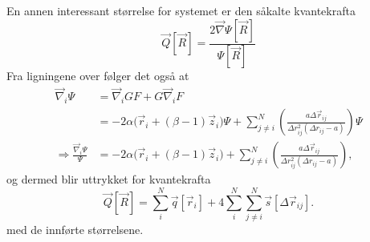 \documentclass[pdftex,10pt,b5paper,twoside]{book}
\begin{document}
En annen interessant størrelse for systemet er den såkalte kvantekrafta
\begin{equation}
\vec{Q}[\vec{R}] = \frac{2\vec{\nabla}\Psi[\vec{R}]}{\Psi[\vec{R}]}
\end{equation}
Fra ligningene over følger det også at
\begin{align}
\vec{\nabla}_i\Psi &= \vec{\nabla}_i G F + G \vec{\nabla}_i F \nonumber\\
&= -2\alpha\Big(\vec{r}_i+(\beta-1)\vec{z}_i\Big)\Psi + \sum\limits_{j \neq i}^N \left(\frac{a\Delta\vec{r}_{ij}}{\Delta{r}_{ij}^2(\Delta{r}_{ij}-a)}\right) \Psi \nonumber\\
\Longrightarrow \frac{\vec{\nabla}_i\Psi}{\Psi} &= -2\alpha\Big(\vec{r}_i+(\beta-1)\vec{z}_i\Big) + \sum\limits_{j \neq i}^N \left(\frac{a\Delta\vec{r}_{ij}}{\Delta{r}_{ij}^2(\Delta{r}_{ij}-a)}\right),
\end{align}
og dermed blir uttrykket for kvantekrafta
\begin{equation}
\vec{Q}[\vec{R}] = \sum\limits_i^N \vec{q}[\vec{r}_i] + 4\sum\limits_i^N\sum\limits_{j \neq i}^N \vec{s}[\Delta\vec{r}_{ij}].
\end{equation}
med de innførte størrelsene.
\end{document}

